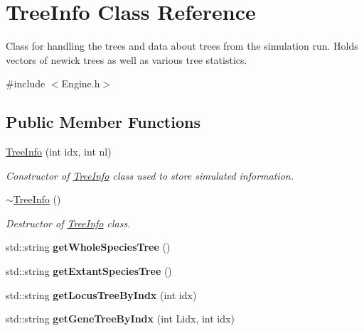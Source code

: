 \hypertarget{class_tree_info}{}\section{Tree\+Info Class Reference}
\label{class_tree_info}


Class for handling the trees and data about trees from the simulation run. Holds vectors of newick trees as well as various tree statistics.  




{\ttfamily \#include $<$Engine.\+h$>$}

\subsection*{Public Member Functions}
\begin{DoxyCompactItemize}
\item 
\mbox{\hyperlink{class_tree_info_a2cab58c1fe56ca853e0c0798ea9ef0c8}{Tree\+Info}} (int idx, int nl)
\begin{DoxyCompactList}\small\item\em Constructor of \mbox{\hyperlink{class_tree_info}{Tree\+Info}} class used to store simulated information. \end{DoxyCompactList}\item 
\mbox{\hyperlink{class_tree_info_a76d5ab3c523122e76f727e1a3455ea3b}{$\sim$\+Tree\+Info}} ()
\begin{DoxyCompactList}\small\item\em Destructor of \mbox{\hyperlink{class_tree_info}{Tree\+Info}} class. \end{DoxyCompactList}\item 
\mbox{\label{class_tree_info_ab72b94242d5588c3a527ab8cceecb191}} 
std\+::string {\bfseries get\+Whole\+Species\+Tree} ()
\item 
\mbox{\label{class_tree_info_a8a9abe0ec92bcb58c874f80a013530e0}} 
std\+::string {\bfseries get\+Extant\+Species\+Tree} ()
\item 
\mbox{\label{class_tree_info_a343c75a13d8b255c43739e9f22b09bdd}} 
std\+::string {\bfseries get\+Locus\+Tree\+By\+Indx} (int idx)
\item 
\mbox{\label{class_tree_info_a1e3a82c8f75bcedee7175e13d3077784}} 
std\+::string {\bfseries get\+Gene\+Tree\+By\+Indx} (int Lidx, int idx)

\end{DoxyCompactItemize}
